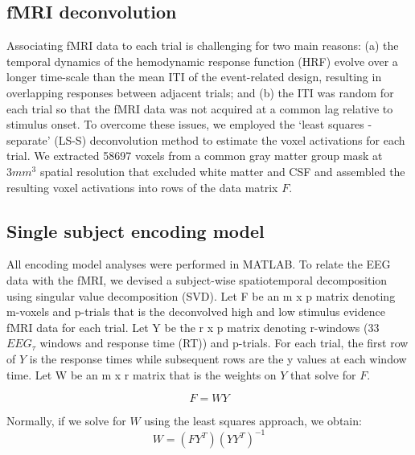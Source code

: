 \subsection*{fMRI deconvolution}
Associating fMRI data to each trial is challenging for two main reasons: (a) the temporal dynamics of the hemodynamic response function (HRF) evolve over a longer time-scale than the mean ITI of the event-related design, resulting in overlapping responses between adjacent trials; and (b) the ITI was random for each trial so that the fMRI data was not acquired at a common lag relative to stimulus onset. To overcome these issues, we employed the `least squares - separate' (LS-S) deconvolution \cite{Mumford2012} method to estimate the voxel activations for each trial. We extracted 58697 voxels from a common gray matter group mask at $3mm^{3}$ spatial resolution that excluded white matter and CSF and assembled the resulting voxel activations into rows of the data matrix $F$.

\subsection*{Single subject encoding model}
All encoding model analyses were performed in MATLAB. To relate the EEG data with the fMRI, we devised a subject-wise spatiotemporal decomposition using singular value decomposition (SVD). Let F be an m x p matrix denoting m-voxels and p-trials that is the deconvolved high and low stimulus evidence fMRI data for each trial. Let Y be the r x p matrix denoting r-windows (33 $EEG_{\tau}$ windows and response time (RT)) and p-trials. For each trial, the first row of $Y$ is the response times while subsequent rows are the y values at each window time. Let W be an m x r matrix that is the weights on $Y$ that solve for $F$.

\begin{equation}
    F=WY
\end{equation}

Normally, if we solve for $W$ using the least squares approach, we obtain:
\begin{equation}
    W=(FY^{T})(YY^{T})^{-1}	
\end{equation}					

